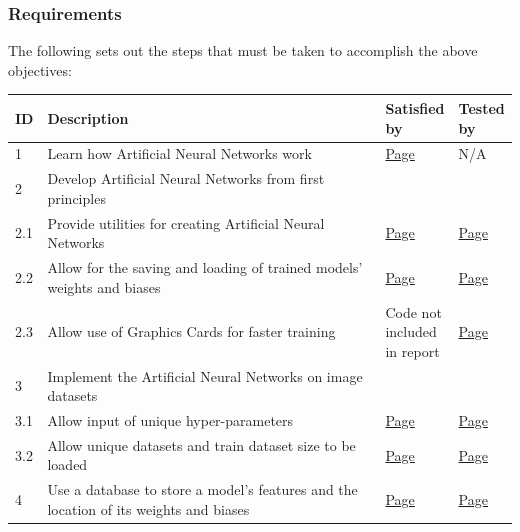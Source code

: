 \documentclass[./project-report/src/latex/project-report.tex]{subfiles}
\begin{document}
\subsubsection{Requirements}

The following sets out the steps that must be taken to accomplish the above objectives:

\noindent\begin{tabular}{|p{0.03\linewidth}|p{0.73\linewidth}|p{0.12\linewidth}|p{0.12\linewidth}|}
      \hline
      \textbf{ID} & \textbf{Description} & \textbf{Satisfied by} & \textbf{Tested by} \\
      \hline
      1 & Learn how Artificial Neural Networks work & \hyperref[sec:ann-theory]{Page \pageref{sec:ann-theory}} & N/A \\
      \hline
      2 & Develop Artificial Neural Networks from first principles & & \\
      \hline
      2.1 & Provide utilities for creating Artificial Neural Networks & \hyperref[sec:utils-subpackage]{Page \pageref{sec:utils-subpackage}} & \hyperref[sec:models-utils-unit-tests]{Page \pageref{sec:models-utils-unit-tests}} \\
      \hline
      2.2 & Allow for the saving and loading of trained models' weights and biases & \hyperref[sec:model-module]{Page \pageref{sec:model-module}} & \hyperref[sec:models-utils-unit-tests]{Page \pageref{sec:models-utils-unit-tests}} \\
      \hline
      2.3 & Allow use of Graphics Cards for faster training & Code not included in report & \hyperref[sec:cpu-vs-gpu-analysis]{Page \pageref{sec:cpu-vs-gpu-analysis}} \\
      \hline
      3 & Implement the Artificial Neural Networks on image datasets & & \\
      \hline
      3.1 & Allow input of unique hyper-parameters & \hyperref[sec:ann-implementations]{Page \pageref{sec:ann-implementations}} & \hyperref[sec:effects-of-hyper-parameters]{Page \pageref{sec:effects-of-hyper-parameters}} \\
      \hline
      3.2 & Allow unique datasets and train dataset size to be loaded & \hyperref[sec:ann-implementations]{Page \pageref{sec:ann-implementations}} & \hyperref[sec:train-dataset-size-analysis]{Page \pageref{sec:train-dataset-size-analysis}} \\
      \hline
      4 & Use a database to store a model's features and the location of its weights and biases & \hyperref[sec:__main__-module]{Page \pageref{sec:__main__-module}} & \hyperref[sec:database-unit-tests]{Page \pageref{sec:database-unit-tests}} \\

\end{tabular}
\end{document}
